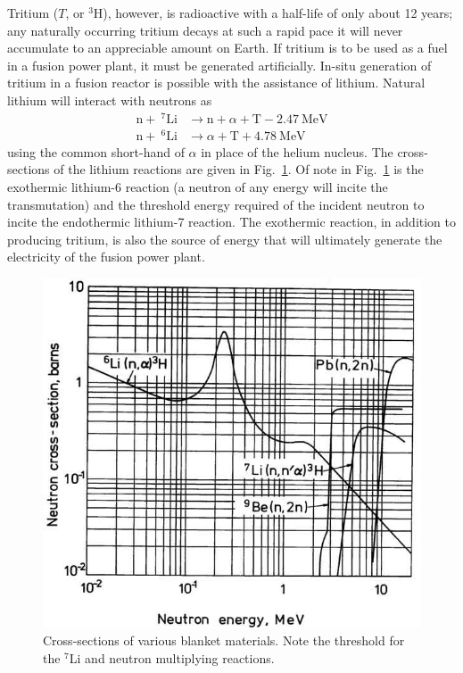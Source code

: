 Tritium ($T$, or $^3$H), however, is radioactive with a half-life of only about 12 years; any naturally occurring tritium decays at such a rapid pace it will never accumulate to an appreciable amount on Earth. If tritium is to be used as a fuel in a fusion power plant, it must be generated artificially. In-situ generation of tritium in a fusion reactor is possible with the assistance of lithium. Natural lithium will interact with neutrons as
\begin{subequations}\label{eq:lithium-t}
\begin{align}
	\mathrm{n} + \ ^7\mathrm{Li} &\xrightarrow \ \mathrm{n}+\alpha + \mathrm{T} -2.47\ \text{MeV}\label{eq:li7-t}\\
	\mathrm{n} + \ ^6\mathrm{Li} &\xrightarrow \  \alpha + \mathrm{T} +4.78\ \text{MeV} \label{eq:li6-t}
\end{align}
\end{subequations}
using the common short-hand of $\alpha$ in place of the helium nucleus. The cross-sections of the lithium reactions are given in Fig.~\ref{fig:li-xsects}. Of note in Fig.~\ref{fig:li-xsects} is the exothermic lithium-6 reaction (a neutron of any energy will incite the transmutation) and the threshold energy required of the incident neutron to incite the endothermic lithium-7 reaction. The exothermic reaction, in addition to producing tritium, is also the source of energy that will ultimately generate the electricity of the fusion power plant.

\begin{figure}[ht]
	\centering
	\includegraphics[width=\singleimagewidth]{chapters/figures/breeding_xsecs} 
	\caption{Cross-sections of various blanket materials. Note the threshold for the $^7$Li and neutron multiplying reactions.}
	\label{fig:li-xsects}
\end{figure}

